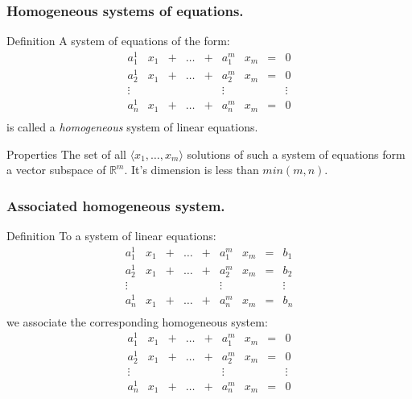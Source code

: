 \documentclass{beamer}
\begin{document}
\begin{frame}
  \frametitle{Homogeneous systems of equations.}
  \begin{block}{Definition}
    A system of equations of the form:
    \[ \begin{array}{ccccccccc}
      a^1_1 & x_1 & + & \dots & + & a^m_1 & x_m & = & 0 \\
      a^1_2 & x_1 & + & \dots & + & a^m_2 & x_m & = & 0\\
      \vdots&     &   &      &  &\vdots&     &   & \vdots\\
      a^1_n & x_1 & + & \dots & + &  a^m_n & x_m & = & 0\\
    \end{array}
    \]
    is called a \emph{homogeneous} system of linear equations.
  \end{block}
  \begin{block}{Properties}
    The set of all $\langle x_1, \dots, x_m \rangle$ solutions of such a system of equations form a vector subspace of $\mathbb{R}^m$. It's dimension is less than $min(m,n)$.
  \end{block}
\end{frame}

\begin{frame}
  \frametitle{Associated homogeneous system.}
  \begin{block}{Definition}
    To a system of linear equations:
    \[ \begin{array}{ccccccccc}
      a^1_1 & x_1 & + & \dots & + & a^m_1 & x_m & = & b_1 \\
      a^1_2 & x_1 & + & \dots & + & a^m_2 & x_m & = & b_2\\
      \vdots&     &   &      &  &\vdots&     &   & \vdots\\
      a^1_n & x_1 & + & \dots & + &  a^m_n & x_m & = & b_n\\
    \end{array}
    \]
    we associate the corresponding homogeneous system:
    \[ \begin{array}{ccccccccc}
      a^1_1 & x_1 & + & \dots & + & a^m_1 & x_m & = & 0 \\
      a^1_2 & x_1 & + & \dots & + & a^m_2 & x_m & = & 0\\
      \vdots&     &   &      &  &\vdots&     &   & \vdots\\
      a^1_n & x_1 & + & \dots & + &  a^m_n & x_m & = & 0\\
    \end{array}
    \]
  \end{block}
\end{frame}
\end{document}
